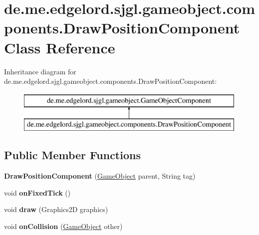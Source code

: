\hypertarget{classde_1_1me_1_1edgelord_1_1sjgl_1_1gameobject_1_1components_1_1_draw_position_component}{}\section{de.\+me.\+edgelord.\+sjgl.\+gameobject.\+components.\+Draw\+Position\+Component Class Reference}
\label{classde_1_1me_1_1edgelord_1_1sjgl_1_1gameobject_1_1components_1_1_draw_position_component}
Inheritance diagram for de.\+me.\+edgelord.\+sjgl.\+gameobject.\+components.\+Draw\+Position\+Component\+:\begin{figure}[H]
\begin{center}
\leavevmode
\includegraphics[height=2.000000cm]{classde_1_1me_1_1edgelord_1_1sjgl_1_1gameobject_1_1components_1_1_draw_position_component}
\end{center}
\end{figure}
\subsection*{Public Member Functions}
\begin{DoxyCompactItemize}
\item 
\mbox{\label{classde_1_1me_1_1edgelord_1_1sjgl_1_1gameobject_1_1components_1_1_draw_position_component_aba3ac1124a979a5720837c49414bd516}} 
{\bfseries Draw\+Position\+Component} (\mbox{\hyperlink{classde_1_1me_1_1edgelord_1_1sjgl_1_1gameobject_1_1_game_object}{Game\+Object}} parent, String tag)
\item 
\mbox{\label{classde_1_1me_1_1edgelord_1_1sjgl_1_1gameobject_1_1components_1_1_draw_position_component_a14895fa95edc90a198a50b7996ca0a42}} 
void {\bfseries on\+Fixed\+Tick} ()
\item 
\mbox{\label{classde_1_1me_1_1edgelord_1_1sjgl_1_1gameobject_1_1components_1_1_draw_position_component_a6636b5744cdd7c81a7bb644b9437ad2b}} 
void {\bfseries draw} (Graphics2D graphics)
\item 
\mbox{\label{classde_1_1me_1_1edgelord_1_1sjgl_1_1gameobject_1_1components_1_1_draw_position_component_abbfd19b43c54709975d2378c95811304}} 
void {\bfseries on\+Collision} (\mbox{\hyperlink{classde_1_1me_1_1edgelord_1_1sjgl_1_1gameobject_1_1_game_object}{Game\+Object}} other)
\end{DoxyCompactItemize}


